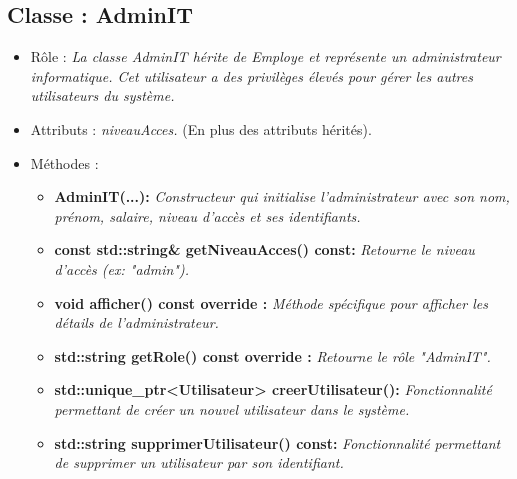 \subsection{Classe : AdminIT}
\begin{itemize}[leftmargin=*]
\item Rôle : \textit{La classe AdminIT hérite de Employe et représente un administrateur informatique. Cet utilisateur a des privilèges élevés pour gérer les autres utilisateurs du système.}
\item Attributs : \textit{niveauAcces.} (En plus des attributs hérités).
\item Méthodes : 
     \begin{itemize}[leftmargin=*]
      \item \textbf{AdminIT(...):} \textit{Constructeur qui initialise l'administrateur avec son nom, prénom, salaire, niveau d'accès et ses identifiants.}
      \item \textbf{const std::string& getNiveauAcces() const:} \textit{Retourne le niveau d'accès (ex: "admin").}
      \item \textbf{void afficher() const override :} \textit{Méthode spécifique pour afficher les détails de l'administrateur.}
      \item \textbf{std::string getRole() const override :} \textit{Retourne le rôle "AdminIT".}
      \item \textbf{std::unique_ptr<Utilisateur> creerUtilisateur():} \textit{Fonctionnalité permettant de créer un nouvel utilisateur dans le système.}
      \item \textbf{std::string supprimerUtilisateur() const:} \textit{Fonctionnalité permettant de supprimer un utilisateur par son identifiant.}
      \end{itemize}
\end{itemize}

